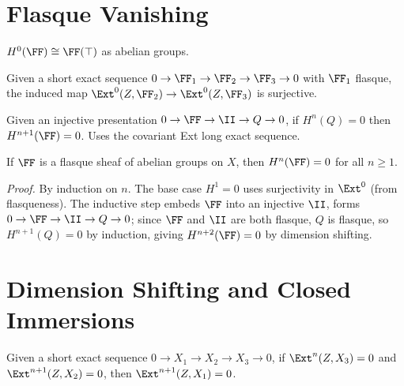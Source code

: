\chapter{Flasque Vanishing}\label{ch:flasque}

\begin{lemma}[Sections at $H^0$]\label{lem:sheafH0EquivSections}
  \leanok
  $H^0(\FF) \cong \FF(\top)$ as abelian groups.
\end{lemma}

\begin{lemma}\label{lem:ext_zero_map_surjective}
  \leanok
  Given a short exact sequence $0 \to \FF_1 \to \FF_2 \to \FF_3 \to 0$
  with $\FF_1$ flasque, the induced map
  $\Ext^0(Z, \FF_2) \to \Ext^0(Z, \FF_3)$ is surjective.
\end{lemma}

\begin{lemma}\label{lem:sheafH_dimension_shift}
  \leanok
  Given an injective presentation $0 \to \FF \to \II \to Q \to 0$,
  if $H^n(Q) = 0$ then $H^{n+1}(\FF) = 0$.
  Uses the covariant Ext long exact sequence.
\end{lemma}

\begin{theorem}\label{thm:FlasqueVanishing}
  \leanok
  If $\FF$ is a flasque sheaf of abelian groups on $X$, then $H^n(\FF) = 0$
  for all $n \ge 1$.

  \emph{Proof.} By induction on $n$. The base case $H^1 = 0$ uses surjectivity
  in $\Ext^0$ (from flasqueness). The inductive step embeds $\FF$ into an
  injective $\II$, forms $0 \to \FF \to \II \to Q \to 0$; since $\FF$ and $\II$
  are both flasque, $Q$ is flasque, so $H^{n+1}(Q) = 0$ by induction,
  giving $H^{n+2}(\FF) = 0$ by dimension shifting.
\end{theorem}


\chapter{Dimension Shifting and Closed Immersions}\label{ch:dimshift}

\begin{lemma}\label{lem:ext_dimension_shift}
  \leanok
  Given a short exact sequence $0 \to X_1 \to X_2 \to X_3 \to 0$,
  if $\Ext^n(Z, X_3) = 0$ and $\Ext^{n+1}(Z, X_2) = 0$,
  then $\Ext^{n+1}(Z, X_1) = 0$.
\end{lemma}

